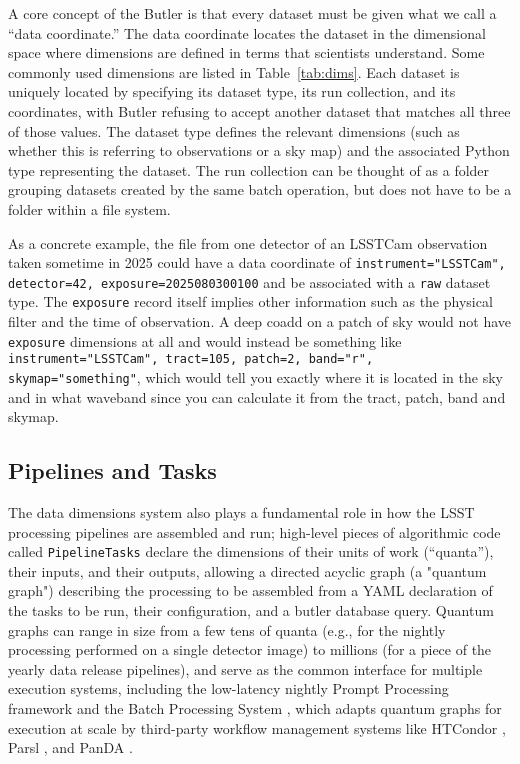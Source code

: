 A core concept of the Butler is that every dataset must be given what we call a ``data coordinate.''
The data coordinate locates the dataset in the dimensional space where dimensions are defined in terms that scientists understand.
Some commonly used dimensions are listed in Table~\ref{tab:dims}.
Each dataset is uniquely located by specifying its dataset type, its run collection, and its coordinates, with Butler refusing to accept another dataset that matches all three of those values.
The dataset type defines the relevant dimensions (such as whether this is referring to observations or a sky map) and the associated Python type representing the dataset.
The run collection can be thought of as a folder grouping datasets created by the same batch operation, but does not have to be a folder within a file system.

As a concrete example, the file from one detector of an LSSTCam observation taken sometime in 2025 could have a data coordinate of \texttt{instrument="LSSTCam", detector=42, exposure=2025080300100} and be associated with a \texttt{raw} dataset type.
The \texttt{exposure} record itself implies other information such as the physical filter and the time of observation.
A deep coadd on a patch of sky would not have \texttt{exposure} dimensions at all and would instead be something like \texttt{instrument="LSSTCam", tract=105, patch=2, band="r", skymap="something"}, which would tell you exactly where it is located in the sky and in what waveband since you can calculate it from the tract, patch, band and skymap.

\subsection{Pipelines and Tasks}

The data dimensions system also plays a fundamental role in how the LSST processing pipelines are assembled and run; high-level pieces of algorithmic code called \texttt{PipelineTasks} declare the dimensions of their units of work (``quanta''), their inputs, and their outputs, allowing a directed acyclic graph (a "quantum graph") describing the processing to be assembled from a YAML declaration of the tasks to be run, their configuration, and a butler database query.
Quantum graphs can range in size from a few tens of quanta (e.g., for the nightly processing performed on a single detector image) to millions (for a piece of the yearly data release pipelines), and serve as the common interface for multiple execution systems, including the low-latency nightly Prompt Processing framework and the Batch Processing System \citep[BPS;][]{2022arXiv221115795G}, which adapts quantum graphs for execution at scale by third-party workflow management systems like HTCondor \citep{2024zndo..14238973H}, Parsl \citep{10.1145/3307681.3325400}, and PanDA \citep{2024EPJWC.29504026K}.

